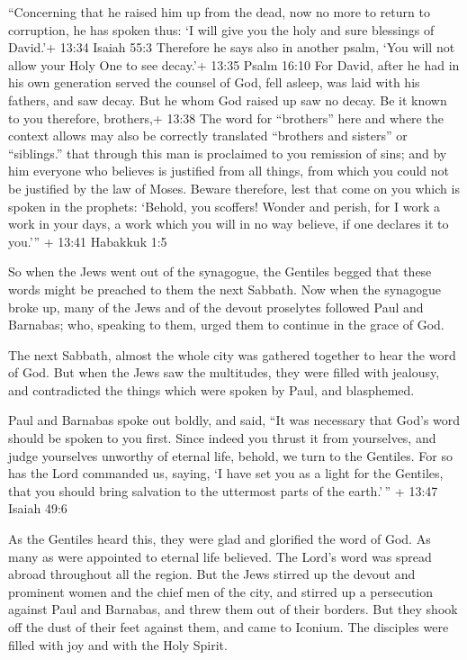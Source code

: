  ``Concerning that he raised him up from the dead, now no
more to return to corruption, he has spoken thus: `I will give you the
holy and sure blessings of David.'+ 13:34 Isaiah 55:3 
Therefore he says also in another psalm, `You will not allow your Holy
One to see decay.'+ 13:35 Psalm 16:10  For David, after he
had in his own generation served the counsel of God, fell asleep, was
laid with his fathers, and saw decay.  But he whom God
raised up saw no decay.  Be it known to you therefore,
brothers,+ 13:38 The word for ``brothers'' here and where the context
allows may also be correctly translated ``brothers and sisters'' or
``siblings.'' that through this man is proclaimed to you remission of
sins;  and by him everyone who believes is justified from
all things, from which you could not be justified by the law of Moses.
 Beware therefore, lest that come on you which is spoken in
the prophets:  `Behold, you scoffers! Wonder and perish,
for I work a work in your days, a work which you will in no way believe,
if one declares it to you.''' + 13:41 Habakkuk 1:5

 So when the Jews went out of the synagogue, the Gentiles
begged that these words might be preached to them the next Sabbath.
 Now when the synagogue broke up, many of the Jews and of
the devout proselytes followed Paul and Barnabas; who, speaking to them,
urged them to continue in the grace of God.

 The next Sabbath, almost the whole city was gathered
together to hear the word of God.  But when the Jews saw
the multitudes, they were filled with jealousy, and contradicted the
things which were spoken by Paul, and blasphemed.

 Paul and Barnabas spoke out boldly, and said, ``It was
necessary that God's word should be spoken to you first. Since indeed
you thrust it from yourselves, and judge yourselves unworthy of eternal
life, behold, we turn to the Gentiles.  For so has the Lord
commanded us, saying, `I have set you as a light for the Gentiles, that
you should bring salvation to the uttermost parts of the earth.'\,'' +
13:47 Isaiah 49:6

 As the Gentiles heard this, they were glad and glorified
the word of God. As many as were appointed to eternal life believed.
 The Lord's word was spread abroad throughout all the
region.  But the Jews stirred up the devout and prominent
women and the chief men of the city, and stirred up a persecution
against Paul and Barnabas, and threw them out of their borders.
 But they shook off the dust of their feet against them,
and came to Iconium.  The disciples were filled with joy
and with the Holy Spirit.


